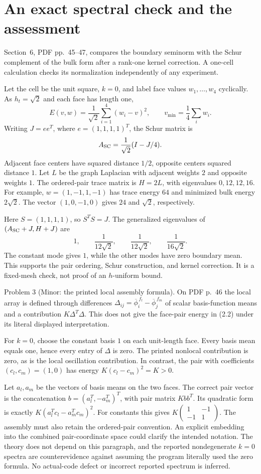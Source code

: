 \documentclass[10pt]{article}
\begin{document}
\section*{An exact spectral check and the assessment}
Section 6, PDF pp. 45–47, compares the boundary seminorm with the Schur complement of the bulk form after a rank-one kernel correction. A one-cell calculation checks its normalization independently of any experiment.\par
Let the cell be the unit square, \(k=0\), and label face values \(w_1,\ldots,w_4\) cyclically. As \(h_t=\sqrt2\) and each face has length one, \[E(v,w)=\frac1{\sqrt2}\sum_{i=1}^4(w_i-v)^2,\qquad
 v_{\min}=\frac14\sum_iw_i.\] Writing \(J=ee^T\), where \(e=(1,1,1,1)^T\), the Schur matrix is \[A_{\rm SC}=\frac1{\sqrt2}(I-J/4).\] Adjacent face centers have squared distance \(1/2\), opposite centers squared distance \(1\). Let \(L\) be the graph Laplacian with adjacent weights \(2\) and opposite weights \(1\). The ordered-pair trace matrix is \(H=2L\), with eigenvalues \(0,12,12,16\). For example, \(w=(1,-1,1,-1)\) has trace energy \(64\) and minimized bulk energy \(2\sqrt2\). The vector \((1,0,-1,0)\) gives \(24\) and \(\sqrt2\), respectively.\par
Here \(S=(1,1,1,1)\), so \(S^TS=J\). The generalized eigenvalues of \((A_{\rm SC}+J,H+J)\) are \[1,\qquad \frac1{12\sqrt2},\qquad
 \frac1{12\sqrt2},\qquad \frac1{16\sqrt2}.\] The constant mode gives \(1\), while the other modes have zero boundary mean. This supports the pair ordering, Schur construction, and kernel correction. It is a fixed-mesh check, not proof of an \(h\)-uniform bound.\par
Problem 3 (Minor: the printed local assembly formula).  On PDF p. 46 the local array is defined through differences \(\Delta_{ij}=\overline\phi_i^{\,f_l}-\overline\phi_j^{\,f_m}\) of scalar basis-function means and a contribution \(K\Delta^T\Delta\). This does not give the face-pair energy in (2.2) under its literal displayed interpretation.\par
For \(k=0\), choose the constant basis \(1\) on each unit-length face. Every basis mean equals one, hence every entry of \(\Delta\) is zero. The printed nonlocal contribution is zero, as is the local oscillation contribution. In contrast, the pair with coefficients \((c_l,c_m)=(1,0)\) has energy \(K(c_l-c_m)^2=K>0\).\par
Let \(a_l,a_m\) be the vectors of basis means on the two faces. The correct pair vector is the concatenation \(b=(a_l^T,-a_m^T)^T\), with pair matrix \(Kbb^T\). Its quadratic form is exactly \(K(a_l^Tc_l-a_m^Tc_m)^2\). For constants this gives \(K\left(\begin{smallmatrix}1&-1\\-1&1\end{smallmatrix}\right)\). The assembly must also retain the ordered-pair convention. An explicit embedding into the combined pair-coordinate space could clarify the intended notation. The theory does not depend on this paragraph, and the reported nondegenerate \(k=0\) spectra are counterevidence against assuming the program literally used the zero formula. No actual-code defect or incorrect reported spectrum is inferred.\par
\end{document}
